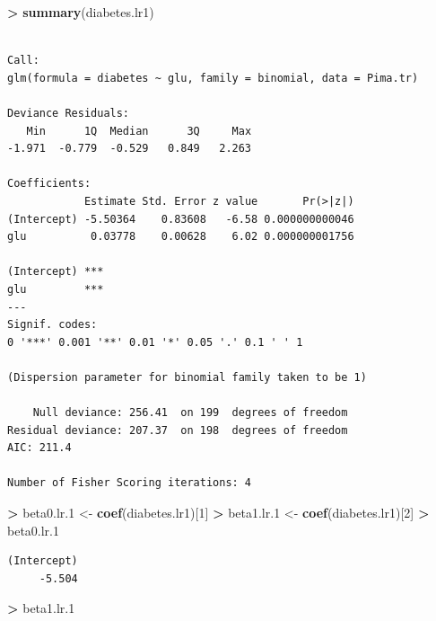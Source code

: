 \documentclass[]{krantz}
\makeatletter
\newenvironment{Shaded}{\begin{snugshade}}{\end{snugshade}}
\newcommand{\KeywordTok}[1]{\textcolor[rgb]{0.27,0.27,0.27}{\textbf{#1}}}
\newcommand{\DecValTok}[1]{\textcolor[rgb]{0.06,0.06,0.06}{#1}}
\newcommand{\StringTok}[1]{\textcolor[rgb]{0.5,0.5,0.5}{#1}}
\newcommand{\OperatorTok}[1]{\textcolor[rgb]{0.43,0.43,0.43}{\textbf{#1}}}
\newcommand{\NormalTok}[1]{#1}
\newenvironment{kframe}{%
\medskip{}
\setlength{\fboxsep}{.8em}
 \def\at@end@of@kframe{}%
 \ifinner\ifhmode%
  \def\at@end@of@kframe{\end{minipage}}%
  \begin{minipage}{\columnwidth}%
 \fi\fi%
 \def\FrameCommand##1{\hskip\@totalleftmargin \hskip-\fboxsep
 \colorbox{shadecolor}{##1}\hskip-\fboxsep
     \hskip-\linewidth \hskip-\@totalleftmargin \hskip\columnwidth}%
 \MakeFramed {\advance\hsize-\width
   \@totalleftmargin\z@ \linewidth\hsize
   \@setminipage}}%
 {\par\unskip\endMakeFramed%
 \at@end@of@kframe}
\renewenvironment{Shaded}{\begin{kframe}}{\end{kframe}}
\makeatother
\begin{document}
\begin{Shaded}
\begin{Highlighting}[]
\OperatorTok{>}\StringTok{ }\KeywordTok{summary}\NormalTok{(diabetes.lr1)}
\end{Highlighting}
\end{Shaded}

\begin{verbatim}

Call:
glm(formula = diabetes ~ glu, family = binomial, data = Pima.tr)

Deviance Residuals: 
   Min      1Q  Median      3Q     Max  
-1.971  -0.779  -0.529   0.849   2.263  

Coefficients:
            Estimate Std. Error z value       Pr(>|z|)
(Intercept) -5.50364    0.83608   -6.58 0.000000000046
glu          0.03778    0.00628    6.02 0.000000001756
               
(Intercept) ***
glu         ***
---
Signif. codes:  
0 '***' 0.001 '**' 0.01 '*' 0.05 '.' 0.1 ' ' 1

(Dispersion parameter for binomial family taken to be 1)

    Null deviance: 256.41  on 199  degrees of freedom
Residual deviance: 207.37  on 198  degrees of freedom
AIC: 211.4

Number of Fisher Scoring iterations: 4
\end{verbatim}

\begin{Shaded}
\begin{Highlighting}[]
\OperatorTok{>}\StringTok{ }\NormalTok{beta0.lr.}\DecValTok{1}\NormalTok{ <-}\StringTok{ }\KeywordTok{coef}\NormalTok{(diabetes.lr1)[}\DecValTok{1}\NormalTok{]}
\OperatorTok{>}\StringTok{ }\NormalTok{beta1.lr.}\DecValTok{1}\NormalTok{ <-}\StringTok{ }\KeywordTok{coef}\NormalTok{(diabetes.lr1)[}\DecValTok{2}\NormalTok{]}
\OperatorTok{>}\StringTok{ }\NormalTok{beta0.lr.}\DecValTok{1}
\end{Highlighting}
\end{Shaded}

\begin{verbatim}
(Intercept) 
     -5.504 
\end{verbatim}

\begin{Shaded}
\begin{Highlighting}[]
\OperatorTok{>}\StringTok{ }\NormalTok{beta1.lr.}\DecValTok{1}
\end{Highlighting}
\end{Shaded}
\end{document}
